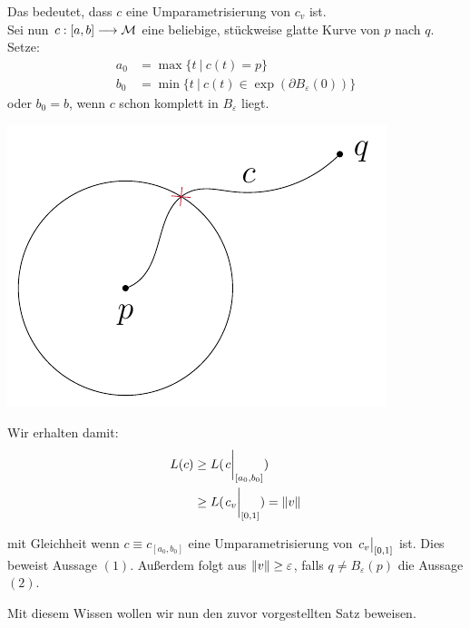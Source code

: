 \begin{bew}
 Das bedeutet, dass $c$ eine Umparametrisierung von $c_v$ ist. \\
Sei nun $c:[a, b] \longrightarrow \mathcal{M}$ eine beliebige, stückweise glatte Kurve von $p$ nach $q$. \\
Setze: 
\begin{align*}
a_0 &= \max\{t \ | \ c(t) = p\} \\
b_0 &= \min\{t \ | \ c(t) \in \exp(\partial B_{\varepsilon}(0))\}
\end{align*}
oder $b_0=b$, wenn $c$ schon komplett in $B_{\varepsilon}$ liegt. \\

\hspace{11cm}
\begin{minipage}[H]{.5\textwidth}
\vspace{-1.2cm}
\includegraphics[scale=0.7]{figures/tikz/curvelength}
\end{minipage}


Wir erhalten damit:
\begin{align}
L(c) &\geq L(\eval{c}_{[a_0, b_0]})  \nonumber \\
&\geq L(\eval{c_v}_{[0, 1]}) = \norm{v}
\end{align}


mit Gleichheit wenn $c \equiv c_{[a_0, b_0]}$ eine Umparametrisierung von $\eval{c_v}_{[0, 1]}$ ist. Dies beweist Aussage $(1)$. Außerdem folgt aus $\norm{v} \geq \varepsilon$, falls $q\neq B_{\varepsilon}(p)$ die Aussage $(2)$.
\end{bew}
Mit diesem Wissen wollen wir nun den zuvor vorgestellten Satz beweisen.
